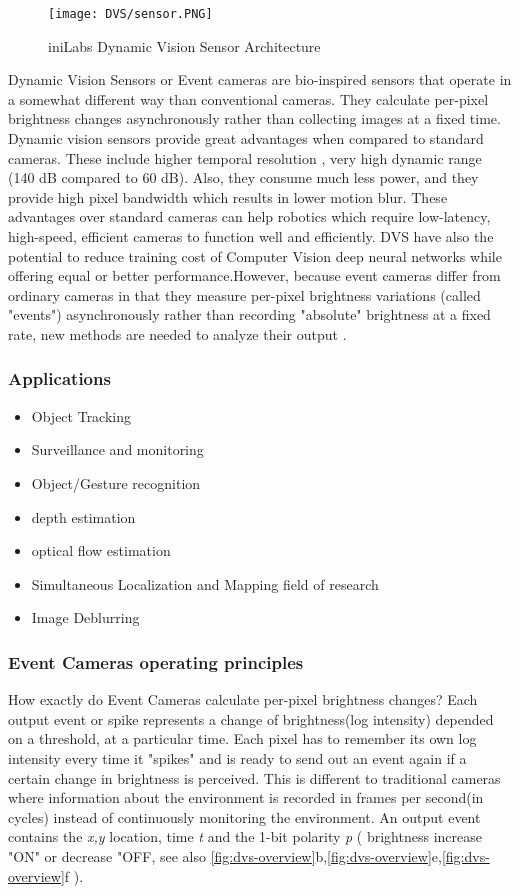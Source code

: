 \documentclass[12pt]{report}
\begin{document}
\begin{wrapfigure}{r}{0.25\textwidth} %
    \centering
     \texttt{[image: DVS/sensor.PNG]}
    \caption{iniLabs Dynamic Vision Sensor Architecture}
    \label{fig:dvs-sensor}
\end{wrapfigure}

Dynamic Vision Sensors or Event cameras are bio-inspired sensors that operate in a somewhat different way than conventional cameras. They calculate per-pixel brightness changes asynchronously rather than collecting images at a fixed time. Dynamic vision sensors provide great advantages when compared to standard cameras. These include higher temporal resolution , very high dynamic range (140 dB compared to 60 dB). Also, they consume much less power, and they provide high pixel bandwidth which results in lower motion blur.  These advantages over standard cameras can help robotics which require low-latency, high-speed, efficient cameras to function well and efficiently. DVS have also the potential to reduce training cost of Computer Vision deep neural networks while offering equal or better performance.However, because event cameras differ from ordinary cameras in that they measure per-pixel brightness variations (called "events") asynchronously rather than recording "absolute" brightness at a fixed rate, new methods are needed to analyze their output .

\subsubsection{Applications}

\begin{itemize}
    \item Object Tracking
    \item Surveillance and monitoring
    \item Object/Gesture recognition
    \item depth estimation
    \item optical flow estimation 
    \item Simultaneous Localization and Mapping field of research
    \item Image Deblurring
\end{itemize}
\subsubsection{Event Cameras operating principles}
How exactly do Event Cameras calculate per-pixel brightness changes? Each output event or spike represents a change of brightness(log intensity) depended on a threshold, at a particular time. Each pixel has to remember its own log intensity every time it "spikes" and is ready to send out an event again if a certain change in brightness is perceived. This is different to traditional cameras where information about the environment is recorded in frames per second(in cycles) instead of continuously monitoring the environment. An output event contains the \textit{x,y}  location, time \textit{t} and the 1-bit polarity \textit{p} ( brightness increase "ON" or decrease "OFF, see also \ref{fig:dvs-overview}b,\ref{fig:dvs-overview}e,\ref{fig:dvs-overview}f \cite{davis}).
\end{document}
